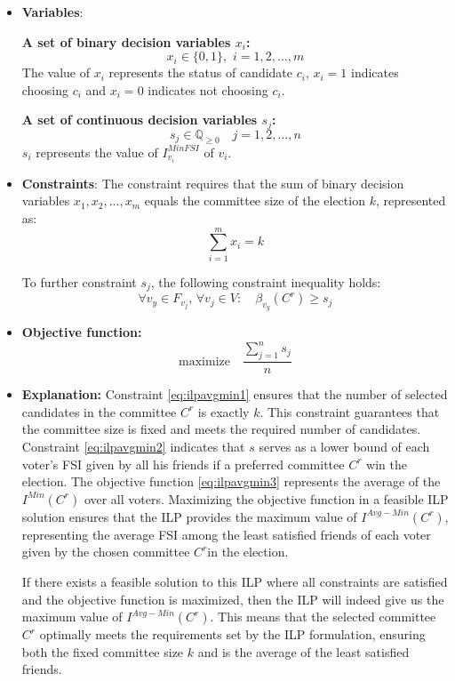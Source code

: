 \documentclass{article}
\begin{document}
\begin{itemize}

  \item \textbf{Variables}: 

\textbf{A set of binary decision variables $x_i$:} \[  x_i \in \{0, 1\} , \,\, i=1,2,\dots, m \] The value of $x_i$ represents the status of candidate $c_i$, \(x_i = 1\) indicates choosing $c_i$ and \(x_i = 0\) indicates not choosing $c_i$.

\textbf{A set of continuous decision variables $s_j$:} 
\[   s_j\in \mathbb{Q}_{\geq 0}  \quad j=1,2,\dots,n \] 
$s_i$ represents the value of $I_{v_i}^{MinFSI}$ of \(v_i\).
    \item \textbf{Constraints}:
The constraint requires that the sum of binary decision variables \(x_1, x_2, \ldots, x_m\) equals the committee size of the election \(k\), represented as:
\begin{equation} \sum_{i=1}^m x_i = k \label{eq:ilpavgmin1}
\end{equation}

To further constraint $s_j$, the following constraint inequality holds:
\begin{equation} \forall v_y \in F_{v_j}, \,  \forall v_j \in V :\quad \beta_{v_y}(C^{r}) \geq s_j  \label{eq:ilpavgmin2}
\end{equation}
  
  \item  \textbf{Objective function:}
  \begin{equation}\text{maximize} \quad \frac{\sum_{j=1}^{n} s_j}{n} \label{eq:ilpavgmin3}
\end{equation}
\item  \textbf{Explanation:}
Constraint \ref{eq:ilpavgmin1} ensures that the number of selected candidates in the committee \(C^r\) is exactly \(k\). This constraint guarantees that the committee size is fixed and meets the required number of candidates.
Constraint \ref{eq:ilpavgmin2} indicates that \(s\) serves as a lower bound of each voter's FSI given by all his friends if a preferred committee \(C^r\) win the election.
The objective function \ref{eq:ilpavgmin3} represents the average of the $I^{Min}(C^{r})$ over all voters. Maximizing  the objective function in a feasible ILP solution ensures that the ILP provides the maximum value of \(I^{Avg-Min}(C^{r})\), representing the average FSI among the least satisfied friends of each voter given by the chosen committee \(C^r\)in the election. 

If there exists a feasible solution to this ILP where all constraints are satisfied and the objective function is maximized, then the ILP will indeed give us the maximum value of \(I^{Avg-Min}(C^{r})\). This means that the selected committee \(C^r\) optimally meets the requirements set by the ILP formulation, ensuring both the fixed committee size \(k\) and is the average of the least satisfied friends. 
\end{itemize}
\end{document}
